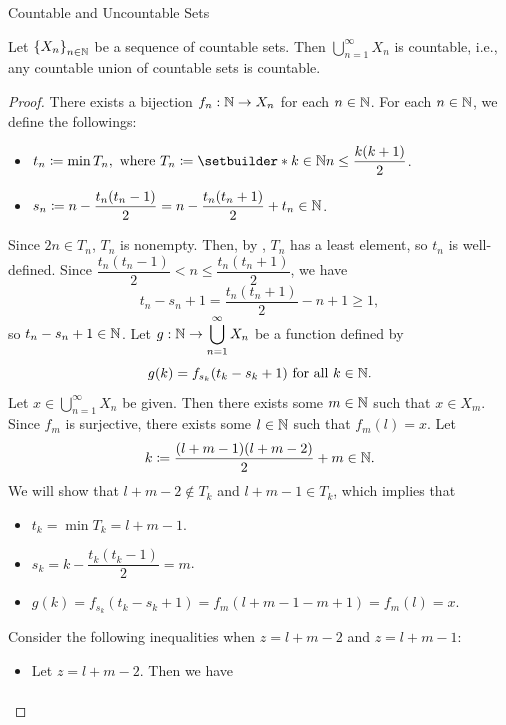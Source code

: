 \begin{section}{Countable and Uncountable Sets}
\begin{theorem} \label{thm:CountableUnionOfCountableSetsIsCountable}
    Let $\set*{X_{n}}_{n \in \N}$ be a sequence of countable sets. Then $\displaystyle
    \bigcup_{n = 1}^{\infty} X_{n}$ is countable, i.e., any countable union of countable sets is countable.
\end{theorem}

\begin{proof}
    There exists a bijection $f_{n}: \N \to X_{n}$ for each $n \in \N$. For each $n \in \N$, we define the followings:
    \begin{itemize}
        \item $t_{n} \coloneqq \min T_{n}, \text{ where } T_{n} \coloneqq \setbuilder*{k \in \N}{n \leq \dfrac{k(k + 1)}{2}}$.
        \item $s_{n} \coloneqq n - \dfrac{t_{n}(t_{n} - 1)}{2} = n - \dfrac{t_{n}(t_{n} + 1)}{2} + t_{n} \in \N$.
    \end{itemize}
    Since $2n \in T_{n}$, $T_{n}$ is nonempty. Then, by , $T_{n}$ has a least element,
    so $t_{n}$ is well-defined. Since $\dfrac{t_{n}(t_{n} - 1)}{2} < n \leq \dfrac{t_{n}(t_{n} + 1)}{2}$, we have
    \[
    t_{n} - s_{n} + 1 = \dfrac{t_{n}(t_{n} + 1)}{2} - n + 1 \geq 1,
    \]
    so $t_{n} - s_{n} + 1 \in \N$. Let $g: \N \to \displaystyle \bigcup_{n = 1}^{\infty} X_{n}$ be a function defined by
    \[
    g(k) = f_{s_{k}}(t_{k} - s_{k} + 1) \text{ for all } k \in \N.
    \]
    Let $x \in \displaystyle \bigcup_{n = 1}^{\infty} X_{n}$ be given. Then there exists some $m \in \N$ such that
    $x \in X_{m}$. Since $f_{m}$ is surjective, there exists some $l \in \N$ such that $f_{m}(l) = x$. Let
    \[
    k \coloneqq \dfrac{(l + m - 1)(l + m - 2)}{2} + m \in \N.
    \]
    We will show that $l + m - 2 \notin T_{k}$ and $l + m - 1 \in T_{k}$, which implies that
    \begin{itemize}
        \item $t_{k} = \min T_{k} = l + m - 1$.
        \item $s_{k} = k - \dfrac{t_{k}(t_{k} - 1)}{2} = m$.
        \item $g(k) = f_{s_{k}}(t_{k} - s_{k} + 1) = f_{m}(l + m - 1 - m + 1) = f_{m}(l) = x$.
    \end{itemize}
    Consider the following inequalities when $z = l + m - 2$ and $z = l + m - 1$:
    \begin{itemize}
        \item Let $z = l + m - 2$. Then we have
        \begin{align*}

\end{align*}
\end{itemize}
\end{proof}
\end{section}
